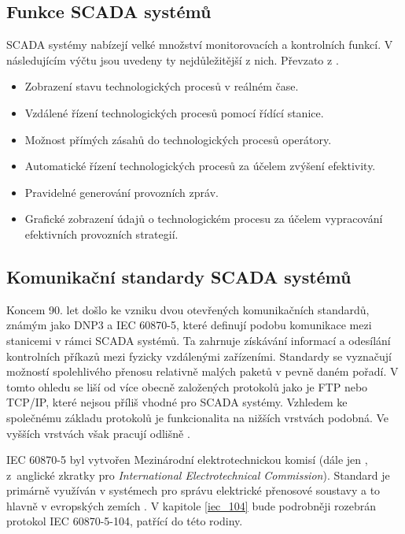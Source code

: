 \subsection{Funkce SCADA systémů}
SCADA systémy nabízejí velké množství monitorovacích a kontrolních funkcí. V následujícím výčtu jsou uvedeny ty nejdůležitější z nich. Převzato z \cite{scada_arch}.
\begin{itemize}
    \item Zobrazení stavu technologických procesů v reálném čase.
    \item Vzdálené řízení technologických procesů pomocí řídící stanice.
    \item Možnost přímých zásahů do technologických procesů operátory.
    \item Automatické řízení technologických procesů za účelem zvýšení efektivity.
    \item Pravidelné generování provozních zpráv.
    \item Grafické zobrazení údajů o technologickém procesu za účelem vypracování efektivních provozních strategií.
\end{itemize}



\subsection{Komunikační standardy SCADA systémů}

Koncem 90. let došlo ke vzniku dvou otevřených komunikačních standardů, známým jako DNP3 a IEC 60870-5, které definují podobu komunikace mezi stanicemi v rámci SCADA systémů. Ta zahrnuje získávání informací a odesílání kontrolních příkazů mezi fyzicky vzdálenými zařízeními. Standardy se vyznačují možností spolehlivého přenosu relativně malých paketů v pevně daném pořadí. V tomto ohledu se liší od více obecně založených protokolů jako je FTP nebo TCP/IP, které nejsou příliš vhodné pro SCADA systémy. Vzhledem ke společnému základu protokolů je funkcionalita na nižších vrstvách podobná. Ve vyšších vrstvách však pracují odlišně \cite{scada_protocols}.

IEC 60870-5 byl vytvořen Mezinárodní elektrotechnickou komisí (dále jen , z~anglické zkratky pro \emph{International Electrotechnical Commission}). Standard je primárně využíván v systémech pro správu elektrické přenosové soustavy a to hlavně v evropských zemích \cite{scada_protocols}. V kapitole \ref{iec_104} bude podrobněji rozebrán protokol IEC 60870-5-104, patřící do této rodiny.

